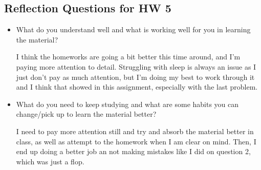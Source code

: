 \subsection*{Reflection Questions for HW 5}
    \begin{itemize}
        \item What do you understand well and what is working well for you in learning the material?
		\begin{reflection}
			I think the homeworks are going a bit better this time around, and I'm paying more attention to detail. Struggling with sleep is always an issue as I just don't pay as much attention, but I'm doing my best to work through it and I think that showed in this assignment, especially with the last problem. 
		\end{reflection}

        \item What do you need to keep studying and what are some habits you can change/pick up to learn the material better?
		\begin{reflection}
			I need to pay more attention still and try and absorb the material better in class, as well as attempt to the homework when I am clear on mind. Then, I end up doing a better job an not making mistakes like I did on question 2, which was just a flop. 
		\end{reflection}

    \end{itemize}
